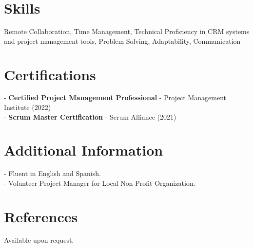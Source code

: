 \documentclass[11pt]{article}
\begin{document}
\section*{Skills}
Remote Collaboration, Time Management, Technical Proficiency in CRM systems and project management tools, Problem Solving, Adaptability, Communication

\section*{Certifications}
- \textbf{Certified Project Management Professional} - Project Management Institute (2022) \\
- \textbf{Scrum Master Certification} - Scrum Alliance (2021)

\section*{Additional Information}
- Fluent in English and Spanish. \\
- Volunteer Project Manager for Local Non-Profit Organization. 

\section*{References}
Available upon request.
\end{document}
